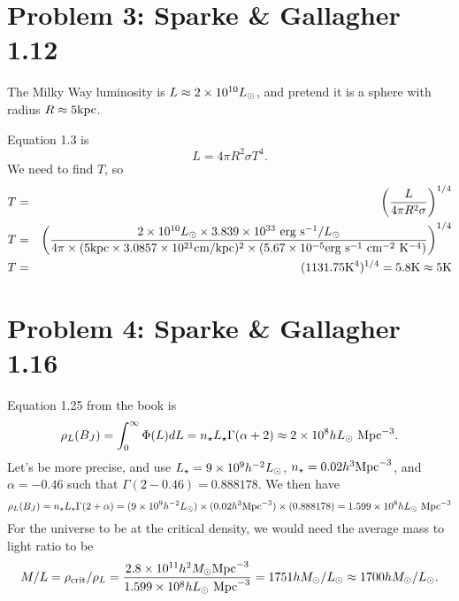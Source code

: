 \documentclass[]{article}
\begin{document}
\section{Problem 3: Sparke \& Gallagher 1.12}

The Milky Way luminosity is $L\approx2\times10^{10}L_{\odot}$,
and pretend it is a sphere with radius $R\approx5\mathrm{kpc}$.

Equation 1.3 is
\begin{equation}
L=4\pi R^2 \sigma T^4.
\end{equation}
\noindent
We need to find $T$, so
\begin{eqnarray}
T &=& \left( \frac{L}{4\pi R^2 \sigma}\right)^{1/4}\\
T &=& \left( \frac{2\times10^{10}L_{\odot} \times 3.839\times10^{33}~\mathrm{erg}~\mathrm{s}^{-1}/L_{\odot}}{4\pi\times(5\mathrm{kpc} \times 3.0857\times10^{21}\mathrm{cm}/\mathrm{kpc})^2 \times (5.67\times10^{-5}\mathrm{erg}~\mathrm{s}^{-1}~\mathrm{cm}^{-2}~\mathrm{K}^{-4})}\right)^{1/4}\\
T &=& (1131.75\mathrm{K}^{4})^{1/4} = 5.8\mathrm{K} \approx 5\mathrm{K}
\end{eqnarray}

\section{Problem 4: Sparke \& Gallagher 1.16}

Equation 1.25 from the book is
\begin{equation}
\rho_{L}(B_J) = \int_{0}^{\infty}\Phi(L)dL = n_{\star}L_{\star}\Gamma(\alpha+2) \approx 2 \times 10^{8}hL_{\odot}~\mathrm{Mpc}^{-3}.
\end{equation}
\noindent
Let's be more precise, and use $L_\star = 9\times10^{9}h^{-2}L_{\odot}$, $n_{\star} = 0.02 h^{3}\mathrm{Mpc}^{-3}$, and $\alpha=-0.46$ such that $\Gamma(2-0.46) = 0.888178$.  We then have
\begin{equation}
\rho_L (B_J) = n_{\star}L_\star\Gamma(2+\alpha) = (9\times10^{9}h^{-2}L_{\odot}) \times (0.02 h^{3}\mathrm{Mpc}^{-3}) \times (0.888178) = 1.599\times10^{8}hL_{\odot}~\mathrm{Mpc}^{-3}
\end{equation}
\noindent
For the universe to be at the critical density, we would need
the average mass to light ratio to be
\begin{equation}
M/L = \rho_{\mathrm{crit}}/\rho_L = \frac{2.8\times10^{11}h^{2}M_{\odot}\mathrm{Mpc}^{-3}}{1.599\times10^{8}hL_{\odot}~\mathrm{Mpc}^{-3}} = 1751 hM_{\odot}/L_{\odot} \approx 1700 hM_{\odot}/L_{\odot}.
\end{equation}
\end{document}
